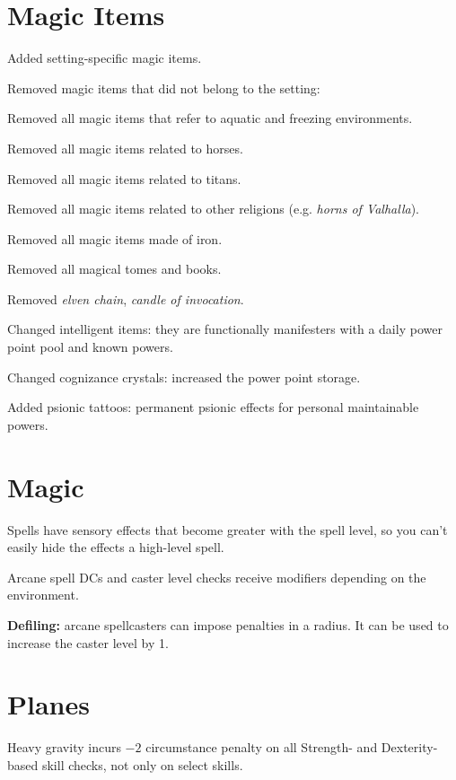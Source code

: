 \section{Magic Items}
\begin{itemize*}
\item Added setting-specific magic items.
\item Removed magic items that did not belong to the setting:
	\begin{itemize*}
	\item Removed all magic items that refer to aquatic and freezing environments.
	\item Removed all magic items related to horses.
	\item Removed all magic items related to titans.
	\item Removed all magic items related to other religions (e.g. \emph{horns of Valhalla}).
	\item Removed all magic items made of iron.
	\item Removed all magical tomes and books.
	\item Removed \emph{elven chain}, \emph{candle of invocation}.
	\end{itemize*}
\item Changed intelligent items: they are functionally manifesters with a daily power point pool and known powers.
\item Changed cognizance crystals: increased the power point storage.
\item Added psionic tattoos: permanent psionic effects for personal maintainable powers.
\end{itemize*}


\section{Magic}
\begin{itemize*}
\item Spells have sensory effects that become greater with the spell level, so you can't easily hide the effects a high-level spell.
\item Arcane spell DCs and caster level checks receive modifiers depending on the environment.
\item \textbf{Defiling:} arcane spellcasters can impose penalties in a radius. It can be used to increase the caster level by 1.
\end{itemize*}

\section{Planes}
Heavy gravity incurs $-2$ circumstance penalty on all Strength- and Dexterity-based skill checks, not only on select skills.

